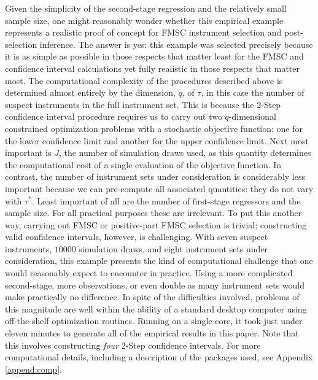 Given the simplicity of the second-stage regression and the relatively small sample size, one might reasonably wonder whether this empirical example represents a realistic proof of concept for FMSC instrument selection and post-selection inference.
The answer is yes: this example was selected precisely because it is as simple as possible in those respects that matter least for the FMSC and confidence interval calculations yet fully realistic in those respects that matter most.
The computational complexity of the procedures described above is determined almost entirely by the dimension, $q$, of $\tau$, in this case the number of suspect instruments in the full instrument set.
This is because the 2-Step confidence interval procedure requires us to carry out two $q$-dimensional constrained optimization problems with a stochastic objective function: one for the lower confidence limit and another for the upper confidence limit.
Next most important is $J$, the number of simulation draws used, as this quantity determines the computational cost of a single evaluation of the objective function.
In contrast, the number of instrument sets under consideration is considerably less important because we can pre-compute all associated quantities: they do not vary with $\tau^*$.
Least important of all are the number of first-stage regressors and the sample size. For all practical purposes these are irrelevant.
To put this another way, carrying out FMSC or positive-part FMSC selection is trivial; constructing valid confidence intervals, however, is challenging. 
With seven suspect instruments, $10000$ simulation draws, and eight instrument sets under consideration, this example presents the kind of computational challenge that one would reasonably expect to encounter in practice.
Using a more complicated second-stage, more observations, or even double as many instrument sets would make practically no difference.
In spite of the difficulties involved, problems of this magnitude are well within the ability of a standard desktop computer using off-the-shelf optimization routines. 
Running on a single core, it took just under eleven minutes to generate all of the empirical results in this paper. 
Note that this involves constructing \emph{four} 2-Step confidence intervals.
For more computational details, including a description of the packages used, see Appendix \ref{append:comp}. 
 

